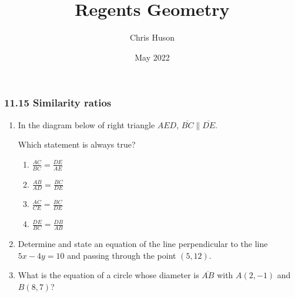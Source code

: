 \documentclass[12pt, oneside]{article}
\title{Regents Geometry}
\author{Chris Huson}
\date{May 2022}
\begin{document}
\subsubsection*{11.15 Similarity ratios}
\begin{enumerate}[itemsep=1.2cm]
\item In the diagram below of right triangle $AED$, $\overline{BC} \parallel \overline{DE}$.
    \begin{center}
    \end{center} 
    Which statement is always true?
    \begin{multicols}{2}
      \begin{enumerate}[itemsep=0.25cm]
        \item $\displaystyle \frac{AC}{BC} = \frac{DE}{AE}$
        \item $\displaystyle \frac{AB}{AD} = \frac{BC}{DE}$ 
        \item $\displaystyle \frac{AC}{CE} = \frac{BC}{DE}$
        \item $\displaystyle \frac{DE}{BC} = \frac{DB}{AB}$
      \end{enumerate}
    \end{multicols}

\item Determine and state an equation of the line perpendicular to the line\\ $5x-4y=10$ and passing through the point $(5,12)$.

\item What is the equation of a circle whose diameter is $\overline{AB}$ with $A(2,-1)$ and $B(8,7)$?
    \begin{flushright}
    \end{flushright}


\end{enumerate}
\end{document}
